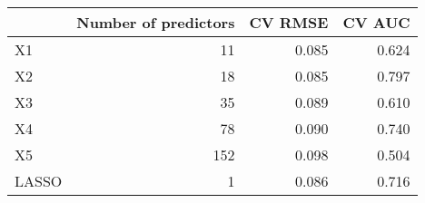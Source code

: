 
\begin{tabular}{lrrr}
\toprule
  & Number of predictors & CV RMSE & CV AUC\\
\midrule
X1 & 11 & 0.085 & 0.624\\
X2 & 18 & 0.085 & 0.797\\
X3 & 35 & 0.089 & 0.610\\
X4 & 78 & 0.090 & 0.740\\
X5 & 152 & 0.098 & 0.504\\
LASSO & 1 & 0.086 & 0.716\\
\bottomrule
\end{tabular}
